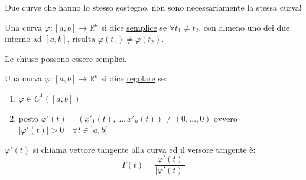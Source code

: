 \begin{oss}
Due curve che hanno lo stesso sostegno, non sono necessariamente la stessa curva!
\end{oss}

\begin{definition}
Una curva $\varphi : [a, b] \to \mathbb{R}^n$ si dice \underline{semplice} se $\forall t_1 \neq t_2$, con almeno uno dei due interno ad $[a, b]$, risulta $\varphi(t_1) \neq \varphi(t_2)$.
\end{definition}

\begin{oss}
Le chiuse possono essere semplici.
\end{oss}

\begin{definition}
Una curva $\varphi : [a, b] \to \mathbb{R}^n$ si dice \underline{regolare} se:
\begin{enumerate}
    \item $\varphi \in C^1([a, b])$
    \item posto $\varphi'(t) = (x'_1(t), \dots, x'_n(t)) \neq (0, \dots, 0)$ ovvero $\vert \varphi'(t) \vert > 0 \quad \forall t \in ]a, b[$
\end{enumerate}
\end{definition}

$\varphi'(t)$ si chiama vettore tangente alla curva ed il versore tangente è:
\[
T(t) = \frac{\varphi'(t)}{\vert \varphi'(t) \vert}
\]

\begin{center}
\end{center}


